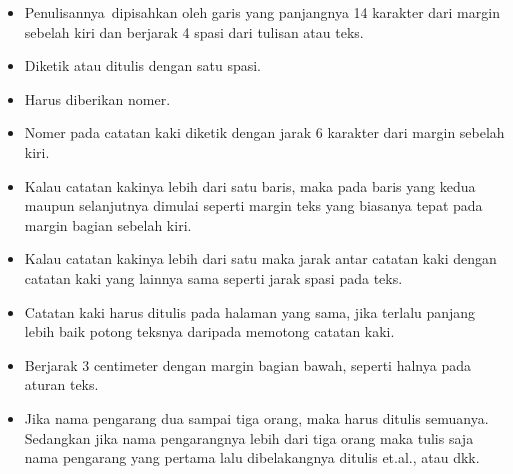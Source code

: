 \begin{itemize}
	\vspace{\baselineskip}
	\item Penulisannya dipisahkan oleh garis yang panjangnya 14 karakter dari margin sebelah kiri dan berjarak 4 spasi dari tulisan atau teks.\par

\vspace{\baselineskip}
	\item Diketik atau ditulis dengan satu spasi.\par

\vspace{\baselineskip}
	\item Harus diberikan nomer.\par

\vspace{\baselineskip}
	\item Nomer pada catatan kaki diketik dengan jarak 6 karakter dari margin sebelah kiri.\par

\vspace{\baselineskip}
	\item Kalau catatan kakinya lebih dari satu baris, maka pada baris yang kedua maupun selanjutnya dimulai seperti margin teks yang biasanya tepat pada margin bagian sebelah kiri.\par

\vspace{\baselineskip}
	\item Kalau catatan kakinya lebih dari satu maka jarak antar catatan kaki dengan catatan kaki yang lainnya sama seperti jarak spasi pada teks.\par

\vspace{\baselineskip}
	\item Catatan kaki harus ditulis pada halaman yang sama, jika terlalu panjang lebih baik potong teksnya daripada memotong catatan kaki.\par

\vspace{\baselineskip}
	\item Berjarak 3 centimeter dengan margin bagian bawah, seperti halnya pada aturan teks.\par

\vspace{\baselineskip}
	\item Jika nama pengarang dua sampai tiga orang, maka harus ditulis semuanya. Sedangkan jika nama pengarangnya lebih dari tiga orang maka tulis saja nama pengarang yang pertama lalu dibelakangnya ditulis et.al., atau dkk.\par


\end{itemize}
